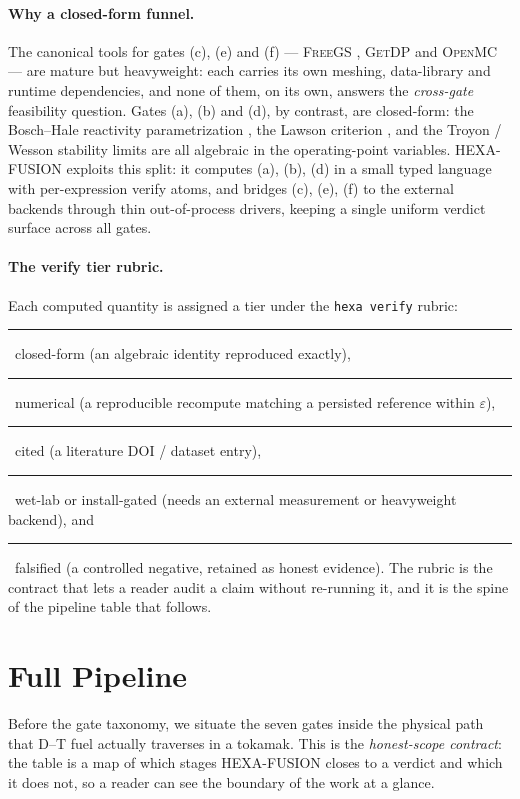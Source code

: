 \documentclass[11pt,a4paper]{article}
\newcommand{\tierdisc}[1]{\textcolor{#1}{\rule[0.05ex]{1.0ex}{1.0ex}}}
\newcommand{\tierBlue}{\tierdisc{blue!70!black}}
\newcommand{\tierGreen}{\tierdisc{green!60!black}}
\newcommand{\tierYellow}{\tierdisc{yellow!85!black}}
\newcommand{\tierOrange}{\tierdisc{orange!90!black}}
\newcommand{\tierRed}{\tierdisc{red!80!black}}
\begin{document}
\paragraph{Why a closed-form funnel.} The canonical tools for gates
(c), (e) and (f) --- \textsc{FreeGS} \citep{freegs}, \textsc{GetDP}
\citep{getdp} and \textsc{OpenMC} \citep{romano2015openmc} --- are
mature but heavyweight: each carries its own meshing, data-library and
runtime dependencies, and none of them, on its own, answers the
\emph{cross-gate} feasibility question. Gates (a), (b) and (d), by
contrast, are closed-form: the Bosch--Hale reactivity parametrization
\citep{boschhale1992}, the Lawson criterion \citep{lawson1957}, and
the Troyon \citep{troyon1984} / Wesson \citep{wesson2011tokamaks}
stability limits are all algebraic in the operating-point variables.
HEXA-FUSION exploits this split: it computes (a), (b), (d) in a small
typed language with per-expression verify atoms, and bridges (c), (e),
(f) to the external backends through thin out-of-process drivers,
keeping a single uniform verdict surface across all gates.

\paragraph{The verify tier rubric.} Each computed quantity is assigned
a tier under the \texttt{hexa verify} rubric: \tierBlue\ closed-form
(an algebraic identity reproduced exactly), \tierGreen\ numerical (a
reproducible recompute matching a persisted reference within
$\varepsilon$), \tierYellow\ cited (a literature DOI / dataset entry),
\tierOrange\ wet-lab or install-gated (needs an external measurement or
heavyweight backend), and \tierRed\ falsified (a controlled negative,
retained as honest evidence). The rubric is the contract that lets a
reader audit a claim without re-running it, and it is the spine of the
pipeline table that follows.

\section{Full Pipeline}
\label{sec:pipeline}

Before the gate taxonomy, we situate the seven gates inside the
physical path that D--T fuel actually traverses in a tokamak. This is
the \emph{honest-scope contract}: the table is a map of which stages
HEXA-FUSION closes to a verdict and which it does not, so a reader can
see the boundary of the work at a glance.
\end{document}
